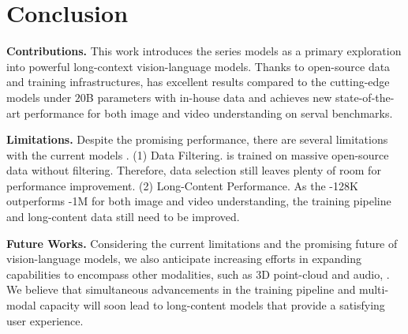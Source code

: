 \section{Conclusion}
\label{sec:conclusion}


\textbf{Contributions.}
%
This work introduces the \OurMethod series models as a primary exploration into powerful long-context vision-language models.
%
Thanks to open-source data and training infrastructures, \OurMethod has excellent results compared to the cutting-edge models under $20$B parameters with in-house data and achieves new state-of-the-art performance for both image and video understanding on serval benchmarks.
%


\textbf{Limitations.}
%
Despite the promising performance, there are several limitations with the current models \OurMethod.
%
(1) Data Filtering.
%
\OurMethod is trained on massive open-source data without filtering.
%
Therefore, data selection still leaves plenty of room for performance improvement.
%
(2) Long-Content Performance.
%
As the \OurMethod-128K outperforms \OurMethod-1M for both image and video understanding, the training pipeline and long-content data still need to be improved.
%



\textbf{Future Works.}
%
Considering the current limitations and the promising future of vision-language models, we also anticipate increasing efforts in expanding \OurMethod capabilities to encompass other modalities, such as 3D point-cloud and audio, \etc.
%
We believe that simultaneous advancements in the training pipeline and multi-modal capacity will soon lead to long-content models that provide a satisfying user experience.
%


